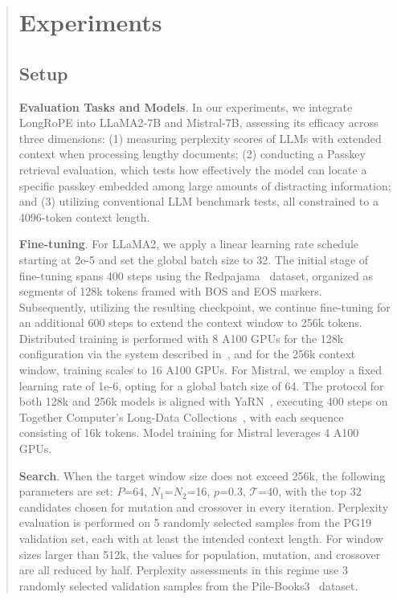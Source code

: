 \begin{abstract}
 \section{Experiments}

\label{sec:exp}
\subsection{Setup}
\textbf{Evaluation Tasks and Models}. In our experiments, we integrate LongRoPE into LLaMA2-7B and Mistral-7B, assessing its efficacy across three dimensions: (1) measuring perplexity scores of LLMs with extended context when processing lengthy documents; (2) conducting a Passkey retrieval evaluation, which tests how effectively the model can locate a specific passkey embedded among large amounts of distracting information; and (3) utilizing conventional LLM benchmark tests, all constrained to a 4096-token context length.

\textbf{Fine-tuning}. For LLaMA2, we apply a linear learning rate schedule starting at 2e-5 and set the global batch size to 32. The initial stage of fine-tuning spans 400 steps using the Redpajama~\cite{redpajama} dataset, organized as segments of 128k tokens framed with BOS and EOS markers. Subsequently, utilizing the resulting checkpoint, we continue fine-tuning for an additional 600 steps to extend the context window to 256k tokens. Distributed training is performed with 8 A100 GPUs for the 128k configuration via the system described in~\cite{cube}, and for the 256k context window, training scales to 16 A100 GPUs. For Mistral, we employ a fixed learning rate of 1e-6, opting for a global batch size of 64. The protocol for both 128k and 256k models is aligned with YaRN~\cite{yarn}, executing 400 steps on Together Computer's Long-Data Collections~\cite{mistraldata}, with each sequence consisting of 16k tokens. Model training for Mistral leverages 4 A100 GPUs.

\textbf{Search}. When the target window size does not exceed 256k, the following parameters are set: $P$=64, $N_1$=$N_2$=16, $p$=0.3, $\mathcal{T}$=40, with the top 32 candidates chosen for mutation and crossover in every iteration. Perplexity evaluation is performed on 5 randomly selected samples from the PG19 validation set, each with at least the intended context length. For window sizes larger than 512k, the values for population, mutation, and crossover are all reduced by half. Perplexity assessments in this regime use 3 randomly selected validation samples from the Pile-Books3~\cite{pile} dataset.


\end{abstract}
